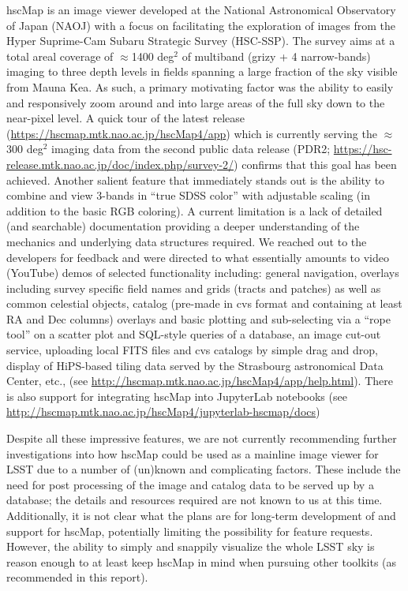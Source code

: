hscMap is an image viewer developed at the National Astronomical Observatory of Japan (NAOJ) with a focus on facilitating the exploration of images from the Hyper Suprime-Cam Subaru Strategic Survey (HSC-SSP).
The survey aims at a total areal coverage of $\approx$1400 deg$^2$ of multiband (grizy + 4 narrow-bands) imaging to three depth levels in fields spanning a large fraction of the sky visible from Mauna Kea.
As such, a primary motivating factor was the ability to easily and responsively zoom around and into large areas of the full sky down to the near-pixel level.
A quick tour of the latest release (\url{https://hscmap.mtk.nao.ac.jp/hscMap4/app}) which is currently serving the $\approx$300 deg$^2$ imaging data from the second public data release (PDR2; \url{https://hsc-release.mtk.nao.ac.jp/doc/index.php/survey-2/}) confirms that this goal has been achieved.
Another salient feature that immediately stands out is the ability to combine and view 3-bands in ``true SDSS color'' \citep{2004PASP..116..133L} with adjustable scaling (in addition to the basic RGB coloring).
A current limitation is a lack of detailed (and searchable) documentation providing a deeper understanding of the mechanics and underlying data structures required.
We reached out to the developers for feedback and were directed to what essentially amounts to video (YouTube) demos of selected functionality including: general navigation, overlays including survey specific field names and grids (tracts and patches) as well as common celestial objects, catalog (pre-made in cvs format and containing at least RA and Dec columns) overlays and basic plotting and sub-selecting via a ``rope tool'' on a scatter plot and SQL-style queries of a database, an image cut-out service, uploading local FITS files and cvs catalogs by simple drag and drop, display of HiPS-based tiling data served by the Strasbourg astronomical Data Center, etc., (see \url{http://hscmap.mtk.nao.ac.jp/hscMap4/app/help.html}).
There is also support for integrating hscMap into JupyterLab notebooks (see \url{http://hscmap.mtk.nao.ac.jp/hscMap4/jupyterlab-hscmap/docs})

Despite all these impressive features, we are not currently recommending further investigations into how hscMap could be used as a mainline image viewer for LSST due to a number of (un)known and complicating factors.
These include the need for post processing of the image and catalog data to be served up by a database; the details and resources required are not known to us at this time.
Additionally, it is not clear what the plans are for long-term development of and support for hscMap, potentially limiting the possibility for feature requests.
However, the ability to simply and snappily visualize the whole LSST sky is reason enough to at least keep hscMap in mind when pursuing other toolkits (as recommended in this report).


